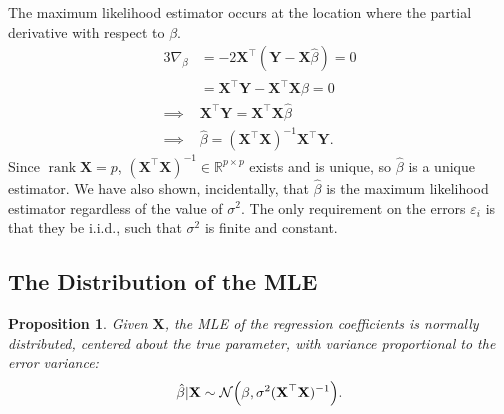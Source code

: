 \documentclass[letterpaper, reqno]{amsart}
\newtheorem{prop}{Proposition}[section]
\numberwithin{equation}{section}
\newcommand{\T}{\top} %
\newcommand{\vect}[1]{\boldsymbol{\mathbf{#1}}} %
\newcommand{\R}{\mathbb{R}}  %
\newcommand{\N}[2]{\mathcal{N}\mleft( #1, #2 \mright)}
\newcommand{\iid}{i.i.d.}
\newcommand{\Xm}{\vect{X}}
\newcommand{\Yv}{\vect{Y}}
\newcommand{\Bv}{\beta}
\newcommand{\Bvh}{\hat{\beta}}
\newcommand{\ve}{\varepsilon}
\DeclareMathOperator{\rank}{rank}
\begin{document}
The maximum likelihood estimator occurs at the location where the partial
derivative with respect to $\Bv$.
\begin{alignat*}{3}
  \nabla_\Bv &= -2\Xm^\T(\Yv - \Xm\Bvh) = 0 \\
  &= \Xm^\T\Yv - \Xm^\T\Xm\Bvh = 0 \\
  \implies &\Xm^\T\Yv = \Xm^\T\Xm\Bvh \\
  \implies &\Bvh = (\Xm^\T\Xm)^{-1}\Xm^\T\Yv.
\end{alignat*}
Since $\rank \Xm = p$, $(\Xm^\T\Xm)^{-1} \in \R^{p \times p}$ exists and is
unique, so $\Bvh$ is a unique estimator. We have also shown, incidentally, that
$\Bvh$ is the maximum likelihood estimator regardless of the value of
$\sigma^2$. The only requirement on the errors $\ve_i$ is that they be \iid, such
that $\sigma^2$ is finite and constant.

\subsection{The Distribution of the MLE} \label{sec:dist_mle}
\begin{prop}
  Given $\Xm$, the MLE of the regression coefficients is normally distributed,
  centered about the true parameter, with variance proportional to the error
  variance:
  \[ \Bvh|\Xm \sim \N{\Bv}{ \sigma^2 (\Xm^\T \Xm)^{-1}}. \]
\end{prop}
\end{document}

